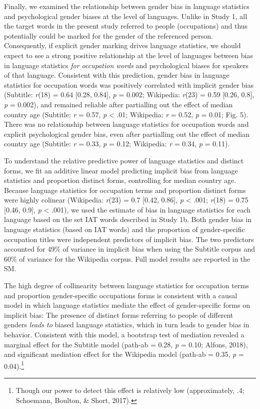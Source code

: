 \documentclass[man,floatsintext]{apa6}
\let\rmarkdownfootnote\footnote%
\def\footnote{\protect\rmarkdownfootnote}
\begin{document}
Finally, we examined the relationship between gender bias in language statistics and psychological gender biases at the level of languages. Unlike in Study 1, all the target words in the present study referred to people (occupations) and thus potentially could be marked for the gender of the referenced person. Consequently, if explicit gender marking drives language statistics, we should expect to see a strong positive relationship at the level of languages between bias in language statistics \emph{for occupation words} and psychological biases for speakers of that language. Consistent with this prediction, gender bias in language statistics for occupation words was positively correlated with implicit gender bias (Subtitle: \emph{r}(18) = 0.64 {[}0.28, 0.84{]}, \emph{p} = 0.002; Wikipedia: \emph{r}(23) = 0.59 {[}0.26, 0.8{]}, \emph{p} = 0.002), and remained reliable after partialling out the effect of median country age (Subtitle: \emph{r} = 0.57, \emph{p} \textless{} .01; Wikipedia: \emph{r} = 0.52, \emph{p} = 0.01; Fig. 5). There was no relationship between language statistics for occupation words and explicit psychological gender bias, even after partialling out the effect of median country age (Subtitle: \emph{r} = 0.33, \emph{p} = 0.12; Wikipedia: \emph{r} = 0.34, \emph{p} = 0.11).

To understand the relative predictive power of language statistics and distinct forms, we fit an additive linear model predicting implicit bias from language statistics and proportion distinct forms, controlling for median country age. Because language statistics for occupation terms and proportion distinct forms were highly colinear (Wikipedia: \emph{r}(23) = 0.7 {[}0.42, 0.86{]}, \emph{p} \textless{} .001; \emph{r}(18) = 0.75 {[}0.46, 0.9{]}, \emph{p} \textless{} .001), we used the estimate of bias in language statistics for each language based on the set IAT words described in Study 1b. Both gender bias in language statistics (based on IAT words) and the proportion of gender-specific occupation titles were independent predictors of implicit bias. The two predictors accounted for 49\% of variance in implicit bias when using the Subtitle corpus and 60\% of variance for the Wikipedia corpus. Full model results are reported in the SM.

The high degree of collinearity between language statistics for occupation terms and proportion gender-specific occupations forms is consistent with a causal model in which language statistics mediate the effect of gender-specific forms on implicit bias: The presence of distinct forms referring to people of different genders \emph{leads to} biased language statistics, which in turn leads to gender bias in behavior. Consistent with this model, a bootstrap test of mediation revealed a marginal effect for the Subtitle model (path-ab = 0.28, \emph{p} = 0.10; Alfons, 2018), and significant mediation effect for the Wikipedia model (path-ab = 0.35, \emph{p} = 0.04).\footnote{Though our power to detect this effect is relatively low (approximately, .4; Schoemann, Boulton, \& Short, 2017).}
\end{document}
